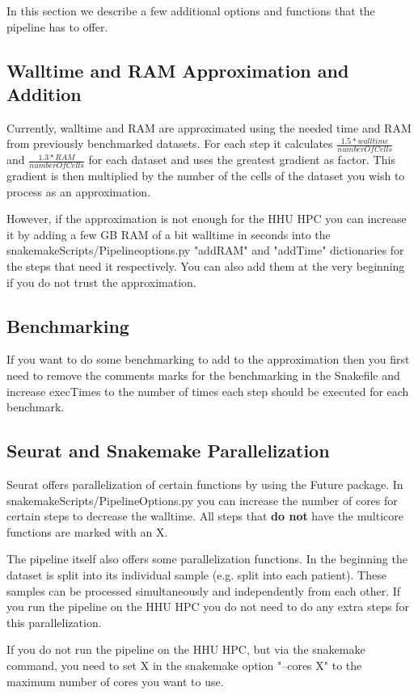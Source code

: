 In this section we describe a few additional options and functions that the pipeline has to offer.

\subsection{Walltime and RAM Approximation and Addition}
Currently, walltime and RAM are approximated using the needed time and RAM from previously benchmarked datasets. For each step it calculates $\frac{1.5*walltime}{numberOfCells}$ and $\frac{1.3*RAM}{numberOfCells}$ for each dataset and uses the greatest gradient as factor. This gradient is then multiplied by the number of the cells of the dataset you wish to process as an approximation. 

However, if the approximation is not enough for the HHU HPC you can increase it by adding a few GB RAM of a bit walltime in seconds into the snakemakeScripts/Pipelineoptions.py "addRAM" and "addTime" dictionaries for the steps that need it respectively. You can also add them at the very beginning if you do not trust the approximation.

\subsection{Benchmarking}
If you want to do some benchmarking to add to the approximation then you first need to remove the comments marks for the benchmarking in the Snakefile and increase execTimes to the number of times each step should be executed for each benchmark.

\subsection{Seurat and Snakemake Parallelization}
Seurat offers parallelization of certain functions by using the Future package. In snakemakeScripts/PipelineOptions.py you can increase the number of cores for certain steps to decrease the walltime. All steps that \textbf{do not} have the multicore functions are marked with an X.

The pipeline itself also offers some parallelization functions. In the beginning the dataset is split into its individual sample (e.g. split into each patient). These samples can be processed simultaneously and independently from each other. If you run the pipeline on the HHU HPC you do not need to do any extra steps for this parallelization.

If you do not run the pipeline on the HHU HPC, but via the snakemake command, you need to set X in the snakemake option "--cores X" to the maximum number of cores you want to use.

